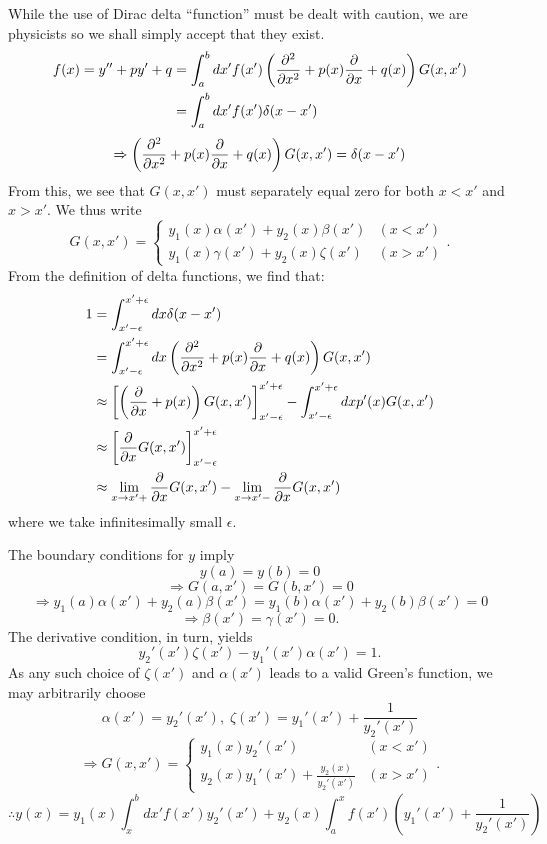 \item
While the use of Dirac delta ``function'' must be dealt with caution,
we are physicists so we shall simply accept that they exist.
\begin{align*}
	f(x)
	= y'' + py' + q
	 & = \int_a^b dx' f(x') \left( \frac{\partial^2}{\partial{}x^2} + p(x) \frac{\partial}{\partial{}x} + q(x) \right) G(x, x') \\
	 & = \int_a^b dx' f(x') \delta(x - x')
\end{align*}
\[
	\Rightarrow \left( \frac{\partial^2}{\partial{}x^2} + p(x) \frac{\partial}{\partial{}x} + q(x) \right) G(x, x') = \delta(x - x')
\]
From this, we see that $G(x, x')$ must separately equal zero for both $x < x'$ and $x > x'$.
We thus write
\[
	G(x, x') =
	\begin{cases}
		y_1(x) \alpha(x') + y_2(x) \beta(x') & (x < x') \\
		y_1(x) \gamma(x') + y_2(x) \zeta(x') & (x > x')
	\end{cases}.
\]
From the definition of delta functions, we find that:
\begin{align*}
	1
	 & = \int_{x' - \epsilon}^{x' + \epsilon} dx \delta(x - x')                                                                \\
	 & = \int_{x' - \epsilon}^{x' + \epsilon} dx \left( \frac{\partial^2}{\partial{}x^2} + p(x) \frac{\partial}{\partial{}x} + q(x) \right) G(x, x') \\
	 & \approx {\left[ \left( \frac{\partial}{\partial{}x} + p(x) \right) G(x, x') \right]}_{x' - \epsilon}^{x' + \epsilon}
	- \int_{x' - \epsilon}^{x' + \epsilon} dx p'(x) G(x, x')                                                                   \\
	 & \approx {\left[ \frac{\partial}{\partial{}x} G(x, x') \right]}_{x' - \epsilon}^{x' + \epsilon}                                      \\
	 & \approx \lim_{x \rightarrow x'+} \frac{\partial}{\partial{}x} G(x, x') - \lim_{x \rightarrow x'-} \frac{\partial}{\partial{}x} G(x, x')
\end{align*}
where we take infinitesimally small $\epsilon$.

The boundary conditions for $y$ imply
\[
	y(a) = y(b) = 0
\]
\[
	\Rightarrow G(a, x') = G(b, x') = 0
\]
\[
	\Rightarrow y_1(a)\alpha(x') + y_2(a)\beta(x') = y_1(b)\alpha(x') + y_2(b)\beta(x') = 0
\]
\[
	\Rightarrow \beta(x') = \gamma(x') = 0.
\]
The derivative condition, in turn, yields
\[
	y_2'(x')\zeta(x') - y_1'(x')\alpha(x') = 1.
\]
As any such choice of $\zeta(x')$ and $\alpha(x')$ leads to a valid Green's function,
we may arbitrarily choose
\[
	\alpha(x') = y_2'(x'),\; \zeta(x') = y_1'(x') + \frac{1}{y_2'(x')}
\]
\[
	\Rightarrow G(x, x') =
	\begin{cases}
		y_1(x)y_2'(x')                           & (x < x') \\
		y_2(x)y_1'(x') + \frac{y_2(x)}{y_2'(x')} & (x > x')
	\end{cases}.
\]
\[
	\therefore y(x)
	= y_1(x) \int_x^b dx' f(x') y_2'(x') + y_2(x) \int_a^x f(x') \left( y_1'(x') + \frac{1}{y_2'(x')} \right)
\]

